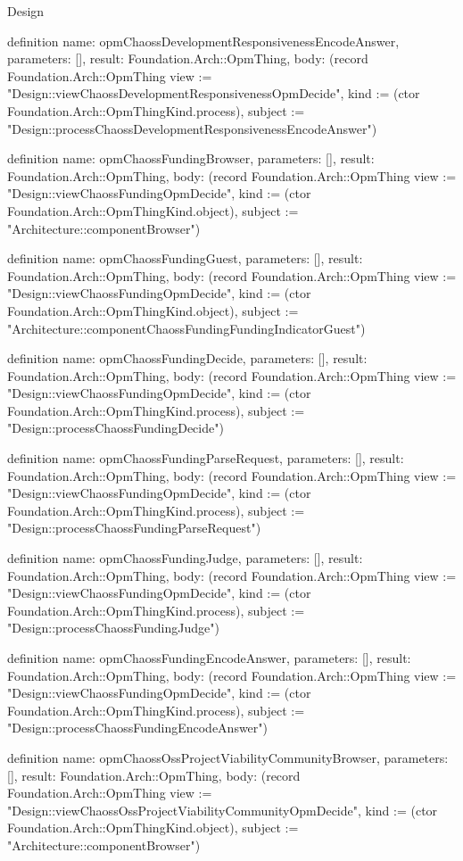 \begin{lexlean}{Design}
\begin{semanticmodule}
definition{
  name: opmChaossDevelopmentResponsivenessEncodeAnswer,
  parameters: [],
  result: Foundation.Arch::OpmThing,
  body: (record Foundation.Arch::OpmThing {view := "Design::viewChaossDevelopmentResponsivenessOpmDecide", kind := (ctor Foundation.Arch::OpmThingKind.process), subject := "Design::processChaossDevelopmentResponsivenessEncodeAnswer"})
}

definition{
  name: opmChaossFundingBrowser,
  parameters: [],
  result: Foundation.Arch::OpmThing,
  body: (record Foundation.Arch::OpmThing {view := "Design::viewChaossFundingOpmDecide", kind := (ctor Foundation.Arch::OpmThingKind.object), subject := "Architecture::componentBrowser"})
}

definition{
  name: opmChaossFundingGuest,
  parameters: [],
  result: Foundation.Arch::OpmThing,
  body: (record Foundation.Arch::OpmThing {view := "Design::viewChaossFundingOpmDecide", kind := (ctor Foundation.Arch::OpmThingKind.object), subject := "Architecture::componentChaossFundingFundingIndicatorGuest"})
}

definition{
  name: opmChaossFundingDecide,
  parameters: [],
  result: Foundation.Arch::OpmThing,
  body: (record Foundation.Arch::OpmThing {view := "Design::viewChaossFundingOpmDecide", kind := (ctor Foundation.Arch::OpmThingKind.process), subject := "Design::processChaossFundingDecide"})
}

definition{
  name: opmChaossFundingParseRequest,
  parameters: [],
  result: Foundation.Arch::OpmThing,
  body: (record Foundation.Arch::OpmThing {view := "Design::viewChaossFundingOpmDecide", kind := (ctor Foundation.Arch::OpmThingKind.process), subject := "Design::processChaossFundingParseRequest"})
}

definition{
  name: opmChaossFundingJudge,
  parameters: [],
  result: Foundation.Arch::OpmThing,
  body: (record Foundation.Arch::OpmThing {view := "Design::viewChaossFundingOpmDecide", kind := (ctor Foundation.Arch::OpmThingKind.process), subject := "Design::processChaossFundingJudge"})
}

definition{
  name: opmChaossFundingEncodeAnswer,
  parameters: [],
  result: Foundation.Arch::OpmThing,
  body: (record Foundation.Arch::OpmThing {view := "Design::viewChaossFundingOpmDecide", kind := (ctor Foundation.Arch::OpmThingKind.process), subject := "Design::processChaossFundingEncodeAnswer"})
}

definition{
  name: opmChaossOssProjectViabilityCommunityBrowser,
  parameters: [],
  result: Foundation.Arch::OpmThing,
  body: (record Foundation.Arch::OpmThing {view := "Design::viewChaossOssProjectViabilityCommunityOpmDecide", kind := (ctor Foundation.Arch::OpmThingKind.object), subject := "Architecture::componentBrowser"})
}


\end{semanticmodule}
\end{lexlean}
